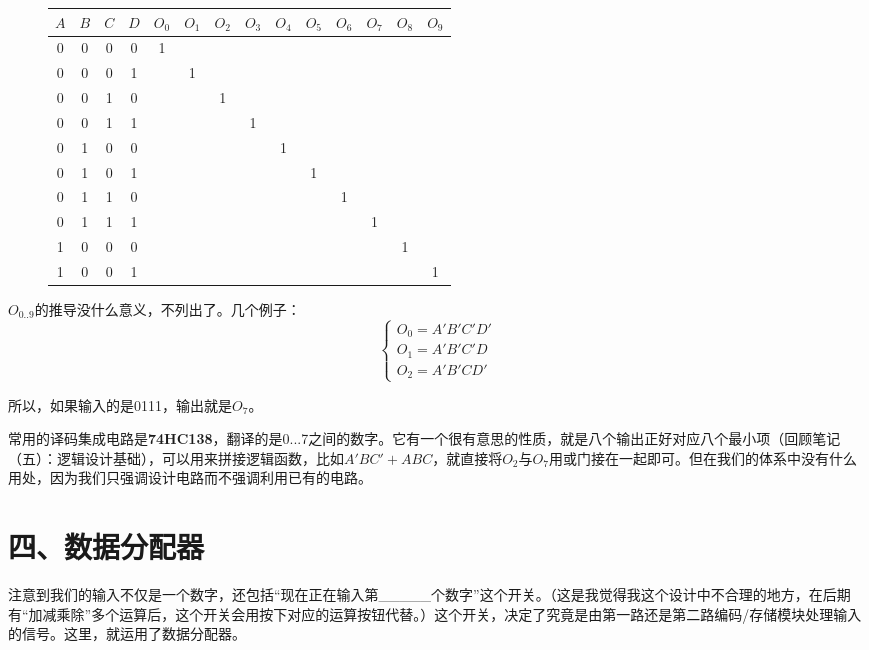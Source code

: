 \documentclass[UTF8]{ctexart}
\begin{document}
\begin{figure}
    \setlength\doublerulesep{0.8pt}
    \begin{tabular}{|c|c|c|c||c|c|c|c|c|c|c|c|c|c|}\hline\rowcolor{lightgray}
        $A$ & $B$ & $C$ & $D$ & $O_0$ & $O_1$ & $O_2$ & $O_3$ & $O_4$ & $O_5$ & $O_6$ & $O_7$ & $O_8$ & $O_9$\\\hline
        0&0&0&0&1& & & & & & & & & \\\hline
        0&0&0&1& &1& & & & & & & & \\\hline
        0&0&1&0& & &1& & & & & & & \\\hline
        0&0&1&1& & & &1& & & & & & \\\hline
        0&1&0&0& & & & &1& & & & & \\\hline
        0&1&0&1& & & & & &1& & & & \\\hline
        0&1&1&0& & & & & & &1& & & \\\hline
        0&1&1&1& & & & & & & &1& & \\\hline
        1&0&0&0& & & & & & & & &1& \\\hline
        1&0&0&1& & & & & & & & & &1\\\hline
    \end{tabular}
\end{figure}

$O_{0..9}$的推导没什么意义，不列出了。几个例子：
\begin{equation*}
\begin{cases}
O_0=A'B'C'D'\\
O_1=A'B'C'D\\
O_2=A'B'CD'
\end{cases}
\end{equation*}

所以，如果输入的是0111，输出就是$O_7$。

常用的译码集成电路是\textbf{74HC138}，翻译的是0...7之间的数字。它有一个很有意思的性质，就是八个输出正好对应八个最小项（回顾笔记（五）：逻辑设计基础），可以用来拼接逻辑函数，比如$A'BC'+ABC$，就直接将$O_2$与$O_7$用或门接在一起即可。但在我们的体系中没有什么用处，因为我们只强调设计电路而不强调利用已有的电路。

\section*{四、数据分配器}

注意到我们的输入不仅是一个数字，还包括“现在正在输入第\_\_\_\_\_个数字”这个开关。（这是我觉得我这个设计中不合理的地方，在后期有“加减乘除”多个运算后，这个开关会用按下对应的运算按钮代替。）这个开关，决定了究竟是由第一路还是第二路编码/存储模块处理输入的信号。这里，就运用了数据分配器。
\end{document}
